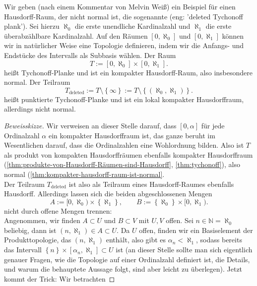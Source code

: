 \begin{example*}

    Wir geben (nach einem Kommentar von {\sc Melvin Weiß}) ein Beispiel für einen Hausdorff-Raum, der nicht normal ist, die sogenannte  (eng: 'deleted Tychonoff plank'). Sei hierzu $\aleph_0$ die erste unendliche Kardinalzahl und $\aleph_1$ die erste überabzählbare Kardinalzahl. Auf den Räumen $[0,\aleph_0]$ und  $[0,\aleph_1]$ können wir in natürlicher Weise eine Topologie definieren, indem wir die Anfangs- und Endstücke des Intervalls als Subbasis wählen. Der Raum
    \[
        T := [0,\aleph_0] \times [0,\aleph_1]
    .\] 
    heißt Tychonoff-Planke und ist ein kompakter Hausdorff-Raum, also insbesondere normal. Der Teilraum
    \[
        T_{\text{deleted}} := T \setminus \left \{\infty\right\}  := T \setminus \left \{(\aleph_0, \aleph_1)\right\} 
    .\] 
    heißt punktierte Tychonoff-Planke und ist ein lokal kompakter Hausdorffraum, allerdings nicht normal.
    \begin{proof}[Beweisskizze]
        Wir verweisen an dieser Stelle darauf, dass $[0,α]$ für jede Ordinalzahl  $α$ ein kompakter Hausdorffraum ist, das ganze beruht im Wesentlichen darauf, dass die Ordinalzahlen eine Wohlordnung bilden. Also ist  $T$ als produkt von kompakten Hausdorffräumen ebenfalls kompakter Hausdorffraum (\autoref{thm:produkte-von-Hausdorff-Räumen-sind-Hausdorff}, \autoref{thm:tychonoff}), also normal (\autoref{thm:kompakter-hausdorff-raum-ist-normal}. \\
        Der Teilraum $T_{\text{deleted}}$ ist also als Teilraum eines Hausdorff-Raumes ebenfalls Hausdorff. Allerdings lassen sich die beiden abgeschlossenen Mengen
        \[
            A:= [0,\aleph_0) \times \left \{\aleph_1\right\}, \qquad B := \left \{\aleph_0\right\} \times [0,\aleph_1)
        .\] 
        nicht durch offene Mengen trennen: \\
        Angenommen, wir finden $A\subset U$ und $B\subset V$ mit $U,V$ offen. Sei  $n\in \mathbb{N} = \aleph_0$ beliebig, dann ist $(n,\aleph_1)\in A\subset U$. Da $U$ offen, finden wir ein Basiselement der Produkttopologie, das  $(n,\aleph_1)$ enthält, also gibt es  $α_n<\aleph_1$, sodass bereits das Intervall  $\left \{n\right\} \times [α_n, \aleph_1] \subset U$ ist (an dieser Stelle sollte man sich eigentlich genauer Fragen, wie die Topologie auf einer Ordinalzahl definiert ist, die Details, und warum die behauptete Aussage folgt, sind aber leicht zu überlegen). Jetzt kommt der Trick: Wir betrachten

\end{proof}
\end{example*}
